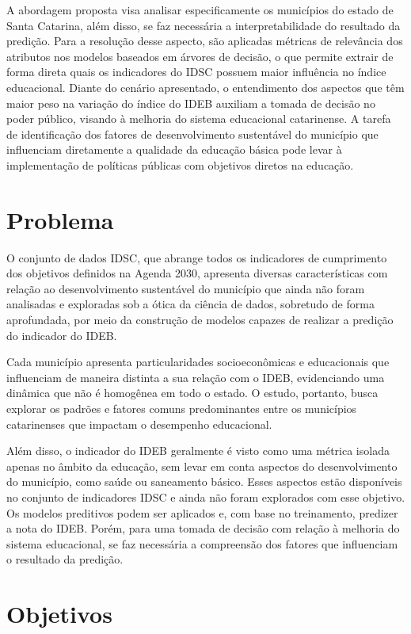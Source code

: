 A abordagem proposta visa analisar especificamente os municípios do estado de Santa Catarina, além disso, se faz necessária a interpretabilidade do resultado da predição. Para a resolução desse aspecto, são aplicadas métricas de relevância dos atributos nos modelos baseados em árvores de decisão, o que permite extrair de forma direta quais os indicadores do IDSC possuem maior influência no índice educacional. Diante do cenário apresentado, o entendimento dos aspectos que têm maior peso na variação do índice do IDEB auxiliam a tomada de decisão no poder público, visando à melhoria do sistema educacional catarinense. A tarefa de identificação dos fatores de desenvolvimento sustentável do município que influenciam diretamente a qualidade da educação básica pode levar à implementação de políticas públicas com objetivos diretos na educação. 

\section{Problema}

O conjunto de dados IDSC, que abrange todos os indicadores de cumprimento dos objetivos definidos na Agenda 2030, apresenta diversas características com relação ao desenvolvimento sustentável do município que ainda não foram analisadas e exploradas sob a ótica da ciência de dados, sobretudo de forma aprofundada, por meio da construção de modelos capazes de realizar a predição do indicador do IDEB.

Cada município apresenta particularidades socioeconômicas e educacionais que influenciam de maneira distinta a sua relação com o IDEB, evidenciando uma dinâmica que não é homogênea em todo o estado. O estudo, portanto, busca explorar os padrões e fatores comuns predominantes entre os municípios catarinenses que impactam o desempenho educacional.

Além disso, o indicador do IDEB geralmente é visto como uma métrica isolada apenas no âmbito da educação, sem levar em conta aspectos do desenvolvimento do município, como saúde ou saneamento básico. Esses aspectos estão disponíveis no conjunto de indicadores IDSC e ainda não foram explorados com esse objetivo. Os modelos preditivos podem ser aplicados e, com base no treinamento, predizer a nota do IDEB. Porém, para uma tomada de decisão com relação à melhoria do sistema educacional, se faz necessária a compreensão dos fatores que influenciam o resultado da predição.

\section{Objetivos}

